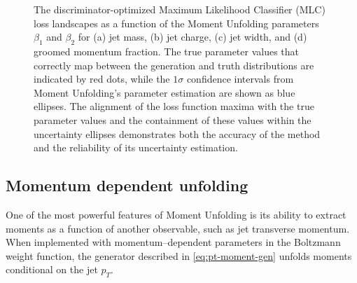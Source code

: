 \begin{figure}
\caption[Loss landscapes showing Moment Unfolding parameter estimation accuracy for unfolding jet substructure variable.]{The discriminator-optimized Maximum Likelihood Classifier (MLC) loss landscapes as a function of the Moment Unfolding parameters $\beta_1$ and $\beta_2$ for (a) jet mass, (b) jet charge, (c) jet width, and (d) groomed momentum fraction. The true parameter values that correctly map between the generation and truth distributions are indicated by red dots, while the $1\sigma$ confidence intervals from Moment Unfolding's parameter estimation are shown as blue ellipses. The alignment of the loss function maxima with the true parameter values and the containment of these values within the uncertainty ellipses demonstrates both the accuracy of the method and the reliability of its uncertainty estimation.}
    \label{fig:jetexample_loss}
\end{figure}
    
    \subsection{Momentum dependent unfolding}
        One of the most powerful features of Moment Unfolding is its ability to extract moments as a function of another observable, such as jet transverse momentum.
        When implemented with momentum--dependent parameters in the Boltzmann weight function, the generator described in \cref{eq:pt-moment-gen} unfolds moments conditional on the jet \(p_T\).
        
